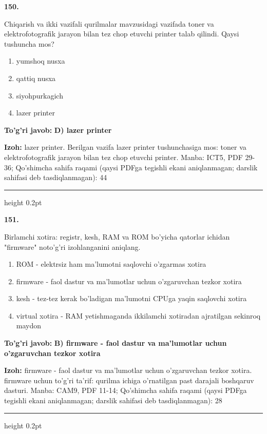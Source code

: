 \documentclass[10pt,a4paper]{article}
\begin{document}
{\bfseries\sffamily\color{ink} 150.}
\par
Chiqarish va ikki vazifali qurilmalar mavzusidagi vazifada toner va elektrofotografik jarayon bilan tez chop etuvchi printer talab qilindi. Qaysi tushuncha mos?
\begin{enumerate}[label=\Alph*),leftmargin=9mm]
\item yumshoq nusxa
\item qattiq nusxa
\item siyohpurkagich
\item lazer printer
\end{enumerate}
\begin{tcolorbox}[enhanced,breakable,colback=teal!4,colframe=teal!60!black,boxrule=0.45pt,arc=1.2mm,left=2.7mm,right=2.7mm,top=1.8mm,bottom=1.8mm,before skip=2mm,after skip=2mm]
{\bfseries\sffamily\color{teal}To'g'ri javob:} \textbf{D) lazer printer}
\par\smallskip
{\bfseries Izoh:} lazer printer. Berilgan vazifa lazer printer tushunchasiga mos: toner va elektrofotografik jarayon bilan tez chop etuvchi printer. Manba: ICT5, PDF 29-36; Qo'shimcha sahifa raqami (qaysi PDFga tegishli ekani aniqlanmagan; darslik sahifasi deb tasdiqlanmagan): 44
\end{tcolorbox}
\vspace{2mm}\hrule height 0.2pt\vspace{3mm}

{\bfseries\sffamily\color{ink} 151.}
\par
Birlamchi xotira: registr, kesh, RAM va ROM bo'yicha qatorlar ichidan "firmware" noto'g'ri izohlanganini aniqlang.
\begin{enumerate}[label=\Alph*),leftmargin=9mm]
\item ROM - elektrsiz ham ma'lumotni saqlovchi o'zgarmas xotira
\item firmware - faol dastur va ma'lumotlar uchun o'zgaruvchan tezkor xotira
\item kesh - tez-tez kerak bo'ladigan ma'lumotni CPUga yaqin saqlovchi xotira
\item virtual xotira - RAM yetishmaganda ikkilamchi xotiradan ajratilgan sekinroq maydon
\end{enumerate}
\begin{tcolorbox}[enhanced,breakable,colback=teal!4,colframe=teal!60!black,boxrule=0.45pt,arc=1.2mm,left=2.7mm,right=2.7mm,top=1.8mm,bottom=1.8mm,before skip=2mm,after skip=2mm]
{\bfseries\sffamily\color{teal}To'g'ri javob:} \textbf{B) firmware - faol dastur va ma'lumotlar uchun o'zgaruvchan tezkor xotira}
\par\smallskip
{\bfseries Izoh:} firmware - faol dastur va ma'lumotlar uchun o'zgaruvchan tezkor xotira. firmware uchun to'g'ri ta'rif: qurilma ichiga o'rnatilgan past darajali boshqaruv dasturi. Manba: CAM9, PDF 11-14; Qo'shimcha sahifa raqami (qaysi PDFga tegishli ekani aniqlanmagan; darslik sahifasi deb tasdiqlanmagan): 28
\end{tcolorbox}
\vspace{2mm}\hrule height 0.2pt\vspace{3mm}
\end{document}
